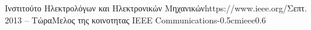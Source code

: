 \documentclass{mycv}
\begin{document}
	\vspace*{0.5cm}
	
	\begin{EntryDatedLogo}{Ινστιτούτο Ηλεκτρολόγων και Ηλεκτρονικών Μηχανικών}{https://www.ieee.org/}{Σεπτ. 2013 -- Τώρα}{Μελος της κοινοτητας IEEE Communications}{-0.5cm}{ieee}{0.6}
	\end{EntryDatedLogo}
	
\end{document}

